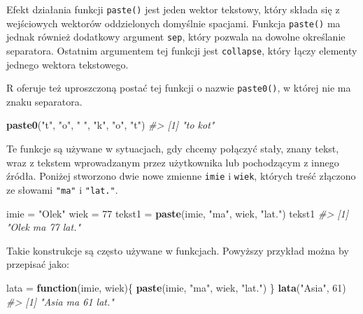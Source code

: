 \documentclass[paper=6in:9in,pagesize=pdftex,headinclude=on,footinclude=on,10pt]{scrbook}
\newenvironment{Shaded}{\begin{snugshade}}{\end{snugshade}}
\newcommand{\CommentTok}[1]{\textcolor[rgb]{0.56,0.35,0.01}{\textit{#1}}}
\newcommand{\ControlFlowTok}[1]{\textcolor[rgb]{0.13,0.29,0.53}{\textbf{#1}}}
\newcommand{\DecValTok}[1]{\textcolor[rgb]{0.00,0.00,0.81}{#1}}
\newcommand{\KeywordTok}[1]{\textcolor[rgb]{0.13,0.29,0.53}{\textbf{#1}}}
\newcommand{\NormalTok}[1]{#1}
\newcommand{\StringTok}[1]{\textcolor[rgb]{0.31,0.60,0.02}{#1}}
\begin{document}
Efekt działania funkcji \texttt{paste()} jest jeden wektor tekstowy, który składa się z wejściowych wektorów oddzielonych domyślnie spacjami.
Funkcja \texttt{paste()} ma jednak również dodatkowy argument \texttt{sep}, który pozwala na dowolne określanie separatora.
Ostatnim argumentem tej funkcji jest \texttt{collapse}, który łączy elementy jednego wektora tekstowego.

R oferuje też uproszczoną postać tej funkcji o nazwie \texttt{paste0()}, w której nie ma znaku separatora.

\begin{Shaded}
\begin{Highlighting}[]
\KeywordTok{paste0}\NormalTok{(}\StringTok{"t"}\NormalTok{, }\StringTok{"o"}\NormalTok{, }\StringTok{" "}\NormalTok{, }\StringTok{"k"}\NormalTok{, }\StringTok{"o"}\NormalTok{, }\StringTok{"t"}\NormalTok{)}
\CommentTok{#> [1] "to kot"}
\end{Highlighting}
\end{Shaded}

Te funkcje są używane w sytuacjach, gdy chcemy połączyć stały, znany tekst, wraz z tekstem wprowadzanym przez użytkownika lub pochodzącym z innego źródła.
Poniżej stworzono dwie nowe zmienne \texttt{imie} i \texttt{wiek}, których treść złączono ze słowami \texttt{"ma"} i \texttt{"lat."}.

\begin{Shaded}
\begin{Highlighting}[]
\NormalTok{imie =}\StringTok{ "Olek"}
\NormalTok{wiek =}\StringTok{ }\DecValTok{77}
\NormalTok{tekst1 =}\StringTok{ }\KeywordTok{paste}\NormalTok{(imie, }\StringTok{"ma"}\NormalTok{, wiek, }\StringTok{"lat."}\NormalTok{)}
\NormalTok{tekst1}
\CommentTok{#> [1] "Olek ma 77 lat."}
\end{Highlighting}
\end{Shaded}

Takie konstrukcje są często używane w funkcjach.
Powyższy przykład można by przepisać jako:

\begin{Shaded}
\begin{Highlighting}[]
\NormalTok{lata =}\StringTok{ }\ControlFlowTok{function}\NormalTok{(imie, wiek)\{}
  \KeywordTok{paste}\NormalTok{(imie, }\StringTok{"ma"}\NormalTok{, wiek, }\StringTok{"lat."}\NormalTok{)}
\NormalTok{\}}
\KeywordTok{lata}\NormalTok{(}\StringTok{"Asia"}\NormalTok{, }\DecValTok{61}\NormalTok{)}
\CommentTok{#> [1] "Asia ma 61 lat."}
\end{Highlighting}
\end{Shaded}
\end{document}
